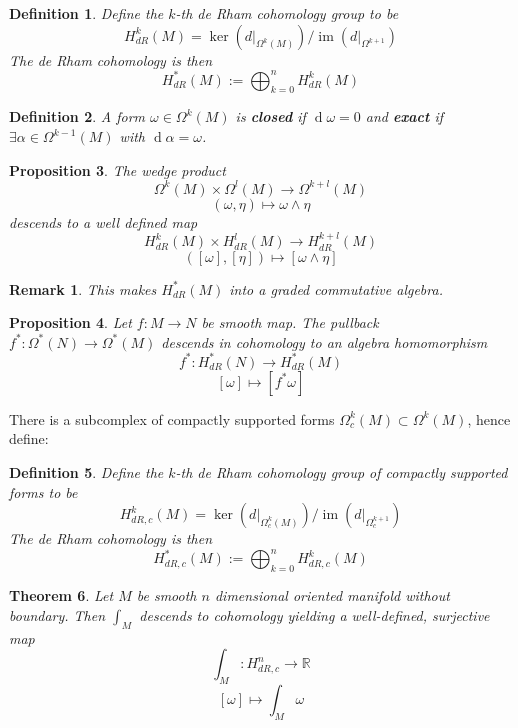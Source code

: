 \documentclass{article}
\newtheorem{theorem}{Theorem}
\numberwithin{theorem}{section}
\newtheorem{proposition}[theorem]{Proposition}
\newtheorem{definition}[theorem]{Definition}
\newtheorem*{remark}{Remark}
\renewcommand{\d}[1]{\ensuremath{\operatorname{d}\!{#1}}}
\newcommand{\R}{\mathbb{R}}
\newcommand{\1}{\mathds{1}}
\DeclareMathOperator{\image}{im}
\begin{document}
\begin{definition}
    Define the $k$-th de Rham cohomology group to be 
    \[ H^k_{dR}(M) = \ker(d|_{\Omega^k(M)}) / \image(d|_{\Omega^{k+1}}) \]
    The de Rham cohomology is then 
    \[ H^*_{dR}(M) := \bigoplus_{k=0}^n H^k_{dR}(M) \]
\end{definition}

\begin{definition}
    A form $\omega \in \Omega^k(M)$ is \textbf{closed} if $\d{\omega} =0$ and \textbf{exact} if $\exists \alpha \in \Omega^{k-1}(M) $ with $\d{\alpha} = \omega $. 
\end{definition}

\begin{proposition}
    The wedge product 
    \[ \Omega^k(M) \times \Omega^l(M) \to \Omega^{k+l}(M) \]
    \[ (\omega, \eta) \mapsto \omega \wedge \eta \]
    descends to a well defined map 
    \[ H_{dR}^k(M) \times H_{dR}^l(M) \to H_{dR}^{k+l}(M) \]
    \[ ([\omega], [\eta]) \mapsto [\omega \wedge \eta]  \]
\end{proposition}

\begin{remark}
    This makes $H^*_{dR}(M)$ into a graded commutative algebra. 
\end{remark}
\begin{proposition}
    Let $f: M \to N$ be smooth map. The pullback $f^*: \Omega^*(N) \to \Omega^*(M)$ descends in cohomology to an algebra homomorphism  
    \[ f^* : H^*_{dR}(N) \to H^*_{dR}(M)\]
    \[ [\omega] \mapsto [f^* \omega] \]
\end{proposition}

There is a subcomplex of compactly supported forms $\Omega^k_c(M) \subset \Omega^k(M)$, hence define: 
\begin{definition}
    Define the $k$-th de Rham cohomology group of compactly supported forms to be 
    \[ H^k_{dR, c }(M) = \ker(d|_{\Omega_c^k(M)}) / \image(d|_{\Omega_c^{k+1}}) \]
    The de Rham cohomology is then 
    \[ H^*_{dR, c}(M) := \bigoplus_{k=0}^n H^k_{dR, c}(M) \]
\end{definition}

\begin{theorem}
    Let $M$ be smooth $n$ dimensional oriented manifold without boundary. Then $\int_M$ descends to cohomology yielding a well-defined, surjective map 
    \[ \int_M : H^n_{dR, c} \to \R \]
    \[ [\omega] \mapsto \int_M \omega  \]
\end{theorem}
\end{document}
